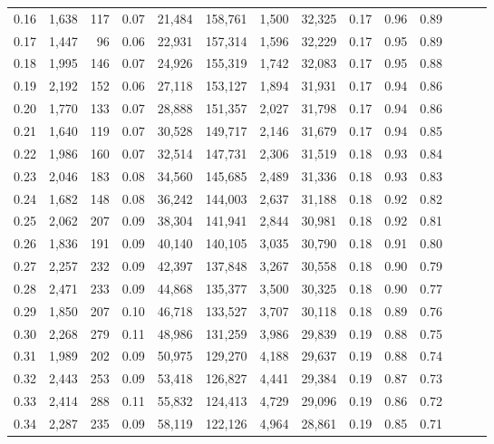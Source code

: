 \begin{tabular}{rrrrrrrrrrrrrr}
0.16 &  1,638 &  117 &  0.07 &   21,484 &  158,761 &   1,500 &  32,325 &  0.17 &  0.96 &      0.89 \\
0.17 &  1,447 &   96 &  0.06 &   22,931 &  157,314 &   1,596 &  32,229 &  0.17 &  0.95 &      0.89 \\
0.18 &  1,995 &  146 &  0.07 &   24,926 &  155,319 &   1,742 &  32,083 &  0.17 &  0.95 &      0.88 \\
0.19 &  2,192 &  152 &  0.06 &   27,118 &  153,127 &   1,894 &  31,931 &  0.17 &  0.94 &      0.86 \\
0.20 &  1,770 &  133 &  0.07 &   28,888 &  151,357 &   2,027 &  31,798 &  0.17 &  0.94 &      0.86 \\
0.21 &  1,640 &  119 &  0.07 &   30,528 &  149,717 &   2,146 &  31,679 &  0.17 &  0.94 &      0.85 \\
0.22 &  1,986 &  160 &  0.07 &   32,514 &  147,731 &   2,306 &  31,519 &  0.18 &  0.93 &      0.84 \\
0.23 &  2,046 &  183 &  0.08 &   34,560 &  145,685 &   2,489 &  31,336 &  0.18 &  0.93 &      0.83 \\
0.24 &  1,682 &  148 &  0.08 &   36,242 &  144,003 &   2,637 &  31,188 &  0.18 &  0.92 &      0.82 \\
0.25 &  2,062 &  207 &  0.09 &   38,304 &  141,941 &   2,844 &  30,981 &  0.18 &  0.92 &      0.81 \\
0.26 &  1,836 &  191 &  0.09 &   40,140 &  140,105 &   3,035 &  30,790 &  0.18 &  0.91 &      0.80 \\
0.27 &  2,257 &  232 &  0.09 &   42,397 &  137,848 &   3,267 &  30,558 &  0.18 &  0.90 &      0.79 \\
0.28 &  2,471 &  233 &  0.09 &   44,868 &  135,377 &   3,500 &  30,325 &  0.18 &  0.90 &      0.77 \\
0.29 &  1,850 &  207 &  0.10 &   46,718 &  133,527 &   3,707 &  30,118 &  0.18 &  0.89 &      0.76 \\
0.30 &  2,268 &  279 &  0.11 &   48,986 &  131,259 &   3,986 &  29,839 &  0.19 &  0.88 &      0.75 \\
0.31 &  1,989 &  202 &  0.09 &   50,975 &  129,270 &   4,188 &  29,637 &  0.19 &  0.88 &      0.74 \\
0.32 &  2,443 &  253 &  0.09 &   53,418 &  126,827 &   4,441 &  29,384 &  0.19 &  0.87 &      0.73 \\
0.33 &  2,414 &  288 &  0.11 &   55,832 &  124,413 &   4,729 &  29,096 &  0.19 &  0.86 &      0.72 \\
0.34 &  2,287 &  235 &  0.09 &   58,119 &  122,126 &   4,964 &  28,861 &  0.19 &  0.85 &      0.71 \\

\end{tabular}
